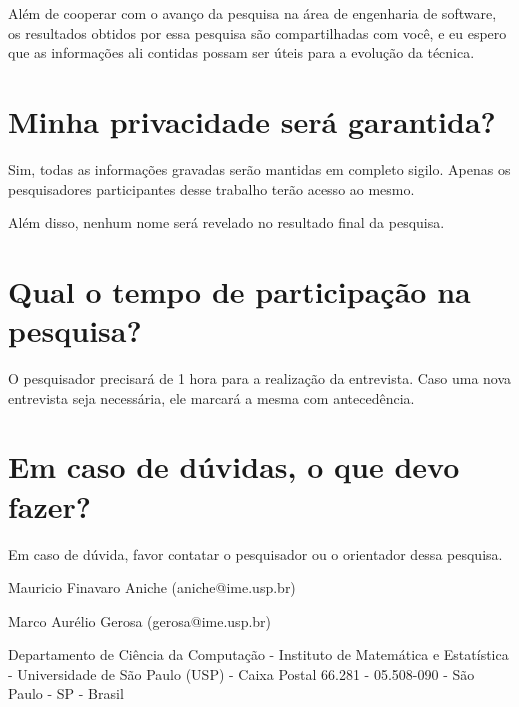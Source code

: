 Além de cooperar com o avanço da pesquisa na área de engenharia de software, os
resultados obtidos por essa pesquisa são compartilhadas com você, e eu espero
que as informações ali contidas possam ser úteis para a evolução da técnica.

\section{Minha privacidade será garantida?}

Sim, todas as informações gravadas serão mantidas em completo sigilo. Apenas os
pesquisadores participantes desse trabalho terão acesso ao mesmo.

Além disso, nenhum nome será revelado no resultado final da pesquisa.

\section{Qual o tempo de participação na pesquisa?}

O pesquisador precisará de 1 hora para a realização da entrevista. Caso
uma nova entrevista seja necessária, ele marcará a mesma com antecedência. 

\section{Em caso de dúvidas, o que devo fazer?}

Em caso de dúvida, favor contatar o pesquisador ou o orientador dessa pesquisa.

Mauricio Finavaro Aniche (aniche@ime.usp.br)

Marco Aurélio Gerosa (gerosa@ime.usp.br) 

Departamento de Ciência da Computação - Instituto de Matemática e Estatística - 
Universidade de São Paulo (USP) - Caixa Postal 66.281 - 05.508-090 - São Paulo -
SP  - Brasil

